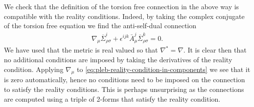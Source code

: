 \documentclass[10pt]{report}
\theoremstyle{definition}
\newcommand{\asd}[0]{\overline{\Sigma}}
\begin{document}
We check that the definition of the torsion free connection in the above way is compatible with the reality conditions. Indeed, by taking the complex conjugate of the torsion free equation we find the anti-self-dual connection
\begin{align}
    \nabla_\mu \asd^i_{\rho\sigma} + \epsilon^{ijk} \bar{A}^j_\mu \asd^k_{\rho\sigma} = 0.
\end{align}
We have used that the metric is real valued so that $\nabla^* = \nabla$. It is clear then that no additional conditions are imposed by taking the derivatives of the reality condition. Applying $\nabla_\mu$ to \cref{eq:pleb-reality-condition-in-components} we see that it is zero automatically, hence no conditions need to be imposed on the connection to satisfy the reality conditions. This is perhaps unsurprising as the connections are computed using a triple of 2-forms that satisfy the reality condition.
\end{document}
